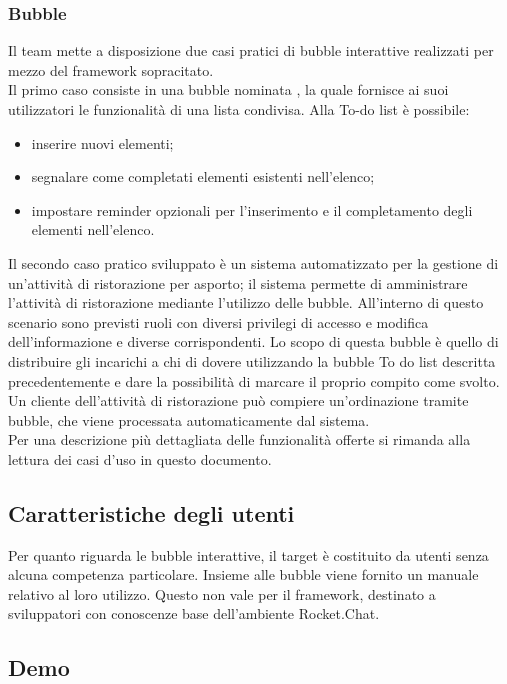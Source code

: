 \subsubsection{Bubble}
Il team \GroupName{} mette a disposizione due casi pratici di bubble interattive realizzati per mezzo del framework sopracitato.\\
Il primo caso consiste in una bubble nominata , la quale fornisce ai suoi utilizzatori le funzionalità di una lista condivisa. Alla To-do list è possibile:
\begin{itemize}
	\item inserire nuovi elementi;
	\item segnalare come completati elementi esistenti nell'elenco;
	\item impostare reminder opzionali per l'inserimento e il completamento degli elementi nell'elenco.
\end{itemize}
Il secondo caso pratico sviluppato è un sistema automatizzato per la gestione di un'attività di ristorazione per asporto; il sistema permette di amministrare l'attività di ristorazione mediante l'utilizzo delle bubble. All'interno di questo scenario sono previsti ruoli con diversi privilegi di accesso e modifica dell'informazione e diverse  corrispondenti.
Lo scopo di questa bubble è quello di distribuire gli incarichi a chi di dovere utilizzando la bubble To do list descritta precedentemente e dare la possibilità di marcare il proprio compito come svolto.\\
Un cliente dell'attività di ristorazione può compiere un'ordinazione tramite bubble, che viene processata automaticamente dal sistema.\\
Per una descrizione più dettagliata delle funzionalità offerte si rimanda alla lettura dei casi d'uso in questo documento.

\subsection{Caratteristiche degli utenti}
Per quanto riguarda le bubble interattive, il target è costituito da utenti senza alcuna competenza particolare. Insieme alle bubble viene fornito un manuale relativo al loro utilizzo. Questo non vale per il framework, destinato a sviluppatori con conoscenze base dell'ambiente Rocket.Chat.

\subsection{Demo}

